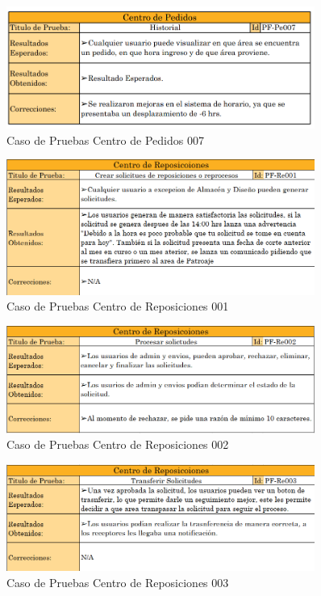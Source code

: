 \documentclass[12pt,letterpaper,spanish]{report}
\begin{document}
\begin{figure}[H]
  \centering
  \includegraphics[width=0.9\textwidth]{PF-Pe007.png}
  \caption{Caso de Pruebas Centro de Pedidos 007}\label{Pe007}
\end{figure}

\begin{figure}[H]
  \centering
  \includegraphics[width=0.9\textwidth]{Rep_01.png}
  \caption{Caso de Pruebas Centro de Reposiciones 001}\label{Re001}
\end{figure}

\begin{figure}[H]
  \centering
  \includegraphics[width=0.9\textwidth]{Rep_02.png}
  \caption{Caso de Pruebas Centro de Reposiciones 002}\label{Re002}
\end{figure}

\begin{figure}[H]
  \centering
  \includegraphics[width=0.9\textwidth]{Rep_03.png}
  \caption{Caso de Pruebas Centro de Reposiciones 003}\label{Pe003}
\end{figure}
\end{document}
